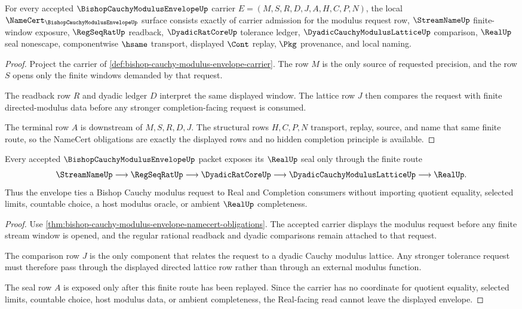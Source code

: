 \begin{theorem}
\label{thm:bishop-cauchy-modulus-envelope-namecert-obligations}
For every accepted $\BishopCauchyModulusEnvelopeUp$ carrier $E=(M,S,R,D,J,A,H,C,P,N)$, the local $\NameCert_{\BishopCauchyModulusEnvelopeUp}$ surface consists exactly of carrier admission for the modulus request row, $\StreamNameUp$ finite-window exposure, $\RegSeqRatUp$ readback, $\DyadicRatCoreUp$ tolerance ledger, $\DyadicCauchyModulusLatticeUp$ comparison, $\RealUp$ seal nonescape, componentwise $\hsame$ transport, displayed $\Cont$ replay, $\Pkg$ provenance, and local naming.
\end{theorem}
\begin{proof}
Project the carrier of \autoref{def:bishop-cauchy-modulus-envelope-carrier}. The row $M$ is the only source of requested precision, and the row $S$ opens only the finite windows demanded by that request.

The readback row $R$ and dyadic ledger $D$ interpret the same displayed window. The lattice row $J$ then compares the request with finite directed-modulus data before any stronger completion-facing request is consumed.

The terminal row $A$ is downstream of $M,S,R,D,J$. The structural rows $H,C,P,N$ transport, replay, source, and name that same finite route, so the NameCert obligations are exactly the displayed rows and no hidden completion principle is available.
\end{proof}

\begin{theorem}
\label{thm:bishop-cauchy-modulus-envelope-real-seal-boundary}
Every accepted $\BishopCauchyModulusEnvelopeUp$ packet exposes its $\RealUp$ seal only through the finite route
$$
\StreamNameUp \longrightarrow \RegSeqRatUp \longrightarrow \DyadicRatCoreUp \longrightarrow \DyadicCauchyModulusLatticeUp \longrightarrow \RealUp .
$$
Thus the envelope ties a Bishop Cauchy modulus request to Real and Completion consumers without importing quotient equality, selected limits, countable choice, a host modulus oracle, or ambient $\RealUp$ completeness.
\end{theorem}
\begin{proof}
Use \autoref{thm:bishop-cauchy-modulus-envelope-namecert-obligations}. The accepted carrier displays the modulus request before any finite stream window is opened, and the regular rational readback and dyadic comparisons remain attached to that request.

The comparison row $J$ is the only component that relates the request to a dyadic Cauchy modulus lattice. Any stronger tolerance request must therefore pass through the displayed directed lattice row rather than through an external modulus function.

The seal row $A$ is exposed only after this finite route has been replayed. Since the carrier has no coordinate for quotient equality, selected limits, countable choice, host modulus data, or ambient completeness, the Real-facing read cannot leave the displayed envelope.
\end{proof}

